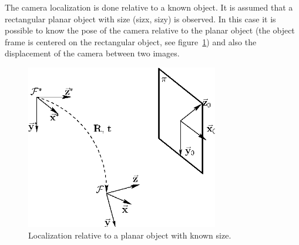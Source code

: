 The camera localization is done relative to a known object. It is
assumed that a rectangular planar object with size (sizx, sizy) is
observed. In this case it is possible to know the pose of the camera
relative to the planar object (the object frame is centered on the
rectangular object, see figure~\ref{model_size}) and also the
displacement of the camera between two images.

\begin{figure}[htbp] 
\begin{center}
\includegraphics[width=0.75\textwidth]{odometry/figures/model_size}
\caption{Localization relative to a planar object with known size.}
\label{model_size}
\end{center}
\end{figure}




